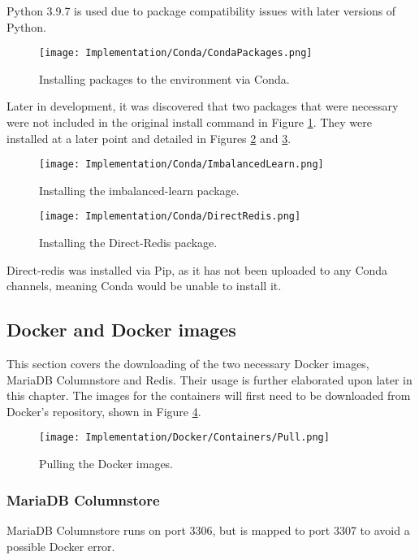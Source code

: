 \para Python 3.9.7 is used due to package compatibility issues with later versions of Python.

\begin{figure}[H]
    \centering
    \texttt{[image: Implementation/Conda/CondaPackages.png]}
    \caption{Installing packages to the environment via Conda.}
    \label{fig:CondaPackages}
\end{figure}

\para Later in development, it was discovered that two packages that were necessary were not included 
in the original install command in Figure \ref{fig:CondaPackages}. They were installed at a later point and 
detailed in Figures \ref{fig:imbLearnInstall} and \ref{fig:directRedisInstall}.

\begin{figure}[H]
    \centering
    \texttt{[image: Implementation/Conda/ImbalancedLearn.png]}
    \caption{Installing the imbalanced-learn package.}
    \label{fig:imbLearnInstall}
\end{figure}

\begin{figure}[H]
    \centering
    \texttt{[image: Implementation/Conda/DirectRedis.png]}
    \caption{Installing the Direct-Redis package.}
    \label{fig:directRedisInstall}
\end{figure}

\para Direct-redis was installed via Pip, as it has not been uploaded to any Conda
channels, meaning Conda would be unable to install it.

\subsection{Docker and Docker images}
This section covers the downloading of the two necessary Docker images, MariaDB Columnstore and Redis. 
Their usage is further elaborated upon later in this chapter. The images for the containers will first need to be
downloaded from Docker's repository, shown in Figure \ref{fig:DockerPull}.

\begin{figure}[H]
    \centering
    \texttt{[image: Implementation/Docker/Containers/Pull.png]}
    \caption{Pulling the Docker images.}
    \label{fig:DockerPull}
\end{figure}

\pagebreak 
\subsubsection{MariaDB Columnstore}
MariaDB Columnstore runs on port 3306, but is mapped to port 3307 to avoid a possible Docker error.

